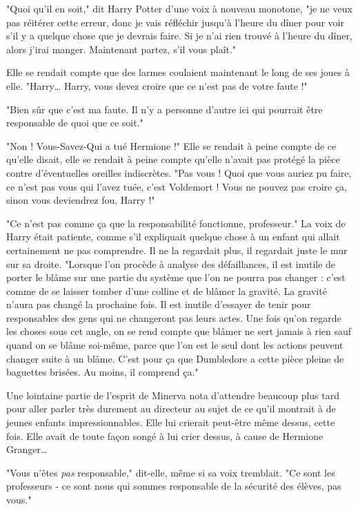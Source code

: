 "Quoi qu'il en soit," dit Harry Potter d'une voix à nouveau monotone, "je ne veux pas réitérer cette erreur, donc je vais réfléchir jusqu'à l'heure du dîner pour voir s'il y a quelque chose que je devrais faire. Si je n'ai rien trouvé à l'heure du dîner, alors j'irai manger. Maintenant partez, s'il vous plaît."

Elle se rendait compte que des larmes coulaient maintenant le long de ses joues à elle. "Harry… Harry, vous devez croire que ce n'est pas de votre faute !"

"Bien sûr que c'est ma faute. Il n'y a personne d'autre ici qui pourrait être responsable de quoi que ce soit."

"Non ! Vous-Savez-Qui a tué Hermione !" Elle se rendait à peine compte de ce qu'elle disait, elle se rendait à peine compte qu'elle n'avait pas protégé la pièce contre d'éventuelles oreilles indiscrètes. "Pas vous ! Quoi que vous auriez pu faire, ce n'est pas vous qui l'avez tuée, c'est Voldemort ! Vous ne pouvez pas croire ça, sinon vous deviendrez fou, Harry !"

"Ce n'est pas comme ça que la responsabilité fonctionne, professeur." La voix de Harry était patiente, comme s'il expliquait quelque chose à un enfant qui allait certainement ne pas comprendre. Il ne la regardait plus, il regardait juste le mur sur sa droite. "Lorsque l'on procède à analyse des défaillances, il est inutile de porter le blâme sur une partie du système que l'on ne pourra pas changer : c'est comme de se laisser tomber d'une colline et de blâmer la gravité. La gravité n'aura pas changé la prochaine fois. Il est inutile d'essayer de tenir pour responsables des gens qui ne changeront pas leurs actes. Une fois qu'on regarde les choses sous cet angle, on se rend compte que blâmer ne sert jamais à rien sauf quand on se blâme soi-même, parce que l'on est le seul dont les actions peuvent changer suite à un blâme. C'est pour ça que Dumbledore a cette pièce pleine de baguettes brisées. Au moins, il comprend ça."

Une lointaine partie de l'esprit de Minerva nota d'attendre beaucoup plus tard pour aller parler très durement au directeur au sujet de ce qu'il montrait à de jeunes enfants impressionnables. Elle lui crierait peut-être même dessus, cette fois. Elle avait de toute façon songé à lui crier dessus, à cause de Hermione Granger…

"Vous n'êtes \emph{pas}  responsable," dit-elle, même si sa voix tremblait. "Ce sont les professeurs - ce sont nous qui sommes responsable de la sécurité des élèves, pas vous."

